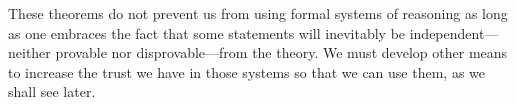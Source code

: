 
These theorems do not prevent us from using formal systems of reasoning as long
as one embraces the fact that some statements will inevitably be
independent---neither provable nor disprovable---from the theory.
We must develop other means to increase the trust we have in those systems so
that we can use them, as we shall see later.